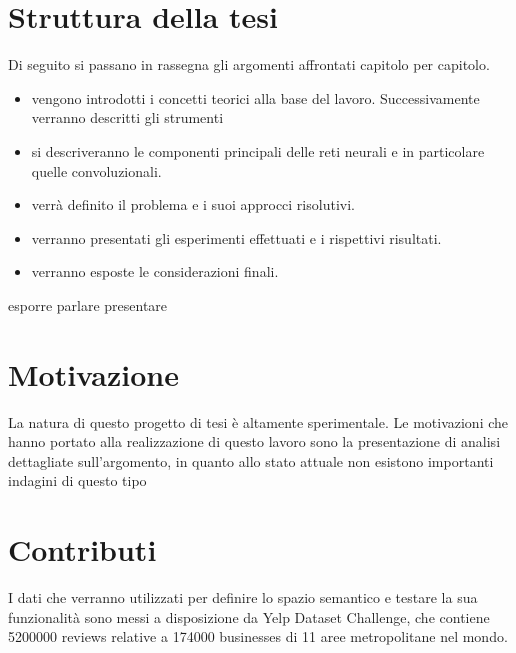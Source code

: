 \section*{Struttura della tesi}
{\color{green}Di seguito si passano in rassegna gli argomenti affrontati capitolo per capitolo.

\begin{itemize}
	\item [\setfont{\bfseries Nel  capitolo \nameref{chap:contesto}}] vengono introdotti i concetti teorici alla base del lavoro. Successivamente verranno descritti gli strumenti 
	\item [\setfont{\bfseries Nel capitolo \nameref{chap:RetiNeurali}}] si descriveranno le componenti principali delle reti neurali e in particolare quelle convoluzionali. 
	\item [\setfont{\bfseries Nel capitolo \nameref{chap:formulazione}}] verrà definito il problema e i suoi approcci risolutivi.
	\item [\setfont{\bfseries Nel capitolo \nameref{chap:esperimenti}}] verranno presentati gli esperimenti effettuati e i rispettivi risultati.
	\item [\setfont{\bfseries Nel capitolo \nameref{chap:conclusioni}}] verranno esposte le considerazioni finali.
\end{itemize}
esporre
parlare
presentare

\section*{Motivazione}
\label{sec:motivazione}

La natura di questo progetto di tesi è altamente sperimentale. Le motivazioni che hanno portato alla realizzazione di questo lavoro sono la presentazione di analisi dettagliate sull'argomento, in quanto allo stato attuale non esistono importanti indagini di questo tipo

\section*{Contributi}
\label{sec:contributi}

I dati che verranno utilizzati per definire lo spazio semantico e testare la sua funzionalità sono messi a disposizione da Yelp Dataset Challenge, che contiene 5200000 reviews relative a 174000 businesses di 11 aree metropolitane nel mondo. 
}